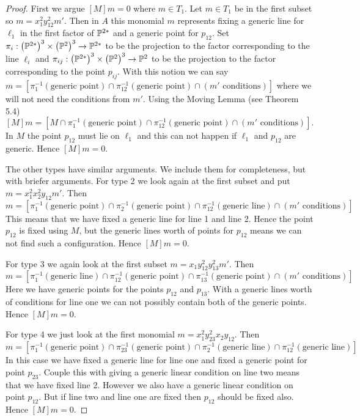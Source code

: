 \documentclass[12pt]{article}
\theoremstyle{plain}
\theoremstyle{definition}
\renewcommand{\P}{\ensuremath \mathbb{P}}
\begin{document}
\begin{proof}
First we argue $[M]m=0$ where $m\in T_1$. Let $m\in T_1$ be in the first subset so $m=x_1^2y_{12}^2m'$. Then in $A$ this monomial $m$ represents fixing a generic line for $\ell_1$ in the first factor of $\P^{2*}$ and a generic point for $p_{12}$. Set $\pi_i : \left( \P^{2*}\right)^3 \times \left( \P^2 \right)^3\to \P^{2*}$ to be the projection to the factor corresponding to the line $\ell_i$ and $\pi_{ij} : \left( \P^{2*}\right)^3 \times \left( \P^2 \right)^3\to \P^{2}$ to be the projection to the factor corresponding to the point $p_{ij}$. With this notion we can say $m=[\pi_{1}^{-1}(\text{generic point}) \cap \pi_{12}^{-1}(\text{generic point})\cap (m' \text{ conditions})]$ where we will not need the conditions from $m'$. Using the Moving Lemma (see \cite{EH} Theorem 5.4) $$[M]m=[M\cap \pi_{1}^{-1}(\text{generic point}) \cap \pi_{12}^{-1}(\text{generic point})\cap (m' \text{ conditions})] .$$ In $M$ the point $p_{12}$ must lie on $\ell_1$ and this can not happen if $\ell_1$ and $p_{12}$ are generic. Hence $[M]m=0.$

The other types have similar arguments. We include them for completeness, but with briefer arguments. For type 2 we look again at the first subset and put $m=x_1^2x_2^2y_{12}m'$. Then $$m=[\pi_{1}^{-1}(\text{generic point})\cap \pi_{2}^{-1}(\text{generic point}) \cap \pi_{12}^{-1}(\text{generic line})\cap (m' \text{ conditions})].$$ This means that we have fixed a generic line for line 1 and line 2. Hence the point $p_{12}$ is fixed using $M$, but the generic lines worth of points for $p_{12}$ means we can not find such a configuration. Hence $[M]m=0$.

For type 3 we again look at the first subset $m=x_1y_{12}^2y_{13}^2m'$. Then $$m=[\pi_{1}^{-1}(\text{generic line})\cap \pi_{12}^{-1}(\text{generic point})\cap \pi_{13}^{-1}(\text{generic point})\cap (m' \text{ conditions})] .$$ Here we have generic points for the points $p_{12}$ and $p_{13}$. With a generic lines worth of conditions for line one we can not possibly contain both of the generic points. Hence $[M]m=0$.

For type 4 we just look at the first monomial $m= x_1^2y_{23}^2x_2y_{12}$. Then $$m=[\pi_{1}^{-1}(\text{generic point})\cap \pi_{23}^{-1}(\text{generic point})\cap \pi_{2}^{-1}(\text{generic line})\cap \pi_{12}^{-1}(\text{generic line})].$$ In this case we have fixed a generic line for line one and fixed a generic point for point $p_{23}$. Couple this with giving a generic linear condition on line two means that we have fixed line 2. However we also have a generic linear condition on point $p_{12}$. But if line two and line one are fixed then $p_{12}$ should be fixed also. Hence $[M]m=0$.


\end{proof}
\end{document}
